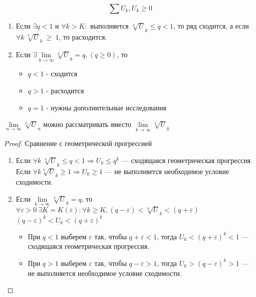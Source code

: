 \pagebreak
\begin{theorem}
  $$\sum U_k, U_k \geq 0$$
  \begin{enumerate}
    \item Если $\exists q < 1$ и $\forall k > K : $ выполняется
      $\sqrt[k]U_k \leq q < 1$, то ряд сходится, а если
      $\forall k \ \sqrt[k]U_k~\geq~1$, то расходится.
    \item Если $\exists \lim\limits_{k \to \infty} \sqrt[k]U_k = q, (q \geq 0)$,
      то
      \begin{itemize}
        \item $q < 1$ - сходится
        \item $q > 1$ - расходится
        \item $q = 1$ - нужны дополнительные исследования
      \end{itemize}
  \end{enumerate}
\end{theorem}
\begin{remark}
  $\lim\limits_{n \to \infty} \sqrt[n]U_n$ можно рассматривать вместо
  $\overline {\lim\limits_{k \to \infty}} \sqrt[k]U_k$
\end{remark}

\begin{proof}
  Сравнение с геометрической прогрессией
  \begin{enumerate}
    \item Если $\forall k\ \sqrt[k]U_k \leq q < 1 \Rightarrow U_k \leq q^k$
      --- сходящаяся геометрическая прогрессия. \\
      Если $\forall k \sqrt[k]U_k \geq 1 \Rightarrow U_k \geq 1$
      --- не выполняется необходимое условие сходимости.
    \item Если $\lim\limits_{k \to \infty} \sqrt[k]U_k = q$, то
      $\forall \varepsilon > 0 \ \exists K = K(\varepsilon) :
      \forall k \geq K, (q - \varepsilon) < \sqrt[k]U_k < (q + \varepsilon)$\\
      $(q - \varepsilon)^k < U_k < (q + \varepsilon)^k$
      \begin{itemize}
        \item При $q < 1$ выберем $\varepsilon$ так, чтобы $q + \varepsilon < 1$,
          тогда $U_k < (q + \varepsilon)^k < 1$
          --- сходящаяся геометрическая прогрессия.
        \item При $q > 1$ выберем $\varepsilon$ так, чтобы $q - \varepsilon > 1$,
          тогда $U_k > (q - \varepsilon)^k > 1$
          --- не выполняется необходимое условие сходимости.
      \end{itemize}
  \end{enumerate}
\end{proof}

